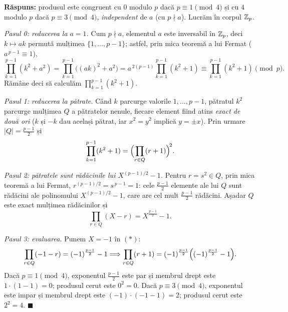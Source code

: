 \begin{solutie}
\textbf{Răspuns:} produsul este congruent cu $0$ modulo $p$ dacă $p \equiv 1 \pmod 4$ și cu $4$ modulo $p$ dacă $p \equiv 3 \pmod 4$, \emph{independent} de $a$ (cu $p \nmid a$). Lucrăm în corpul $\mathbb{Z}_p$.

\emph{Pasul 0: reducerea la $a = 1$.} Cum $p \nmid a$, elementul $a$ este inversabil în $\mathbb{Z}_p$, deci $k \mapsto ak$ permută mulțimea $\{1,\dots,p-1\}$; astfel, prin mica teoremă a lui Fermat ($a^{\,p-1} \equiv 1$),
\[
  \prod_{k=1}^{p-1}(k^2 + a^2)
  = \prod_{k=1}^{p-1}\bigl((ak)^2 + a^2\bigr)
  = a^{\,2(p-1)} \prod_{k=1}^{p-1}(k^2 + 1)
  \equiv \prod_{k=1}^{p-1}(k^2 + 1) \pmod p .
\]
Rămâne deci să calculăm $\prod_{k=1}^{p-1}(k^2+1)$.

\emph{Pasul 1: reducerea la pătrate.} Când $k$ parcurge valorile $1,\dots,p-1$, pătratul $k^2$ parcurge mulțimea $Q$ a pătratelor nenule, fiecare element fiind atins \emph{exact de două ori} ($k$ și $-k$ dau același pătrat, iar $x^2 = y^2$ implică $y = \pm x$). Prin urmare $|Q| = \frac{p-1}{2}$ și
\[
  \prod_{k=1}^{p-1}(k^2+1) = \Bigl( \prod_{r \in Q} (r+1) \Bigr)^{\!2} .
\]

\emph{Pasul 2: pătratele sunt rădăcinile lui $X^{(p-1)/2}-1$.} Pentru $r = s^2 \in Q$, prin mica teoremă a lui Fermat, $r^{(p-1)/2} = s^{\,p-1} = 1$: cele $\frac{p-1}{2}$ elemente ale lui $Q$ sunt rădăcini ale polinomului $X^{(p-1)/2}-1$, care are cel mult $\frac{p-1}{2}$ rădăcini. Așadar $Q$ este exact mulțimea rădăcinilor și
\[
  \prod_{r \in Q} (X - r) = X^{\frac{p-1}{2}} - 1 . \tag{$*$}
\]

\emph{Pasul 3: evaluarea.} Punem $X = -1$ în $(*)$:
\[
  \prod_{r \in Q} (-1 - r) = (-1)^{\frac{p-1}{2}} - 1
  \Longrightarrow
  \prod_{r \in Q} (r + 1) = (-1)^{\frac{p-1}{2}} \Bigl( (-1)^{\frac{p-1}{2}} - 1 \Bigr) .
\]
Dacă $p \equiv 1 \pmod 4$, exponentul $\frac{p-1}{2}$ este par și membrul drept este $1\cdot(1-1) = 0$; produsul cerut este $0^2 = 0$. Dacă $p \equiv 3 \pmod 4$, exponentul este impar și membrul drept este $(-1) \cdot (-1-1) = 2$; produsul cerut este $2^2 = 4$. $\blacksquare$


\end{solutie}

